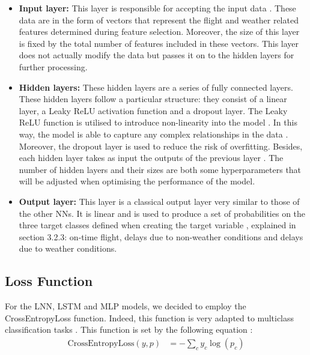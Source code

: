 \documentclass[12pt,oneside]{book} %
\begin{document}
\begin{itemize}
    \item \textbf{Input layer:} This layer is responsible for accepting the input data \cite{NN_structure}. These data are in the form of vectors that represent the flight and weather related features determined during feature selection. Moreover, the size of this layer is fixed by the total number of features included in these vectors. This layer does not actually modify the data but passes it on to the hidden layers for further processing. 
    \item \textbf{Hidden layers:} These hidden layers are a series of fully connected layers. These hidden layers follow a particular structure: they consist of a linear layer, a Leaky ReLU activation function and a dropout layer. The Leaky ReLU function is utilised to introduce non-linearity into the model \cite{NN_structure}. In this way, the model is able to capture any complex relationships in the data \cite{NN_structure}. Moreover, the dropout layer is used to reduce the risk of overfitting. Besides, each hidden layer takes as input the outputs of the previous layer \cite{NN_structure}. The number of hidden layers and their sizes are both some hyperparameters that will be adjusted when optimising the performance of the model. 
    \item \textbf{Output layer:} This layer is a classical output layer very similar to those of the other NNs. It is linear and is used to produce a set of probabilities on the three target classes defined when creating the target variable \cite{NN_structure}, explained in section 3.2.3: on-time flight, delays due to non-weather conditions and delays due to weather conditions.
\end{itemize}

\subsection{Loss Function}
\label{Loss_function}

\noindent For the LNN, LSTM and MLP models, we decided to employ the CrossEntropyLoss function. Indeed, this function is very adapted to multiclass classification tasks \cite{crossentropyloss}. This function is set by the following equation \cite{crossentropyloss_equation}:
\begin{align}
\text{CrossEntropyLoss}(y, p) &= -\sum_{c} y_{c} \log(p_{c})
\label{CrossEntropyLoss}
\end{align}

\noindent {}
\end{document}
